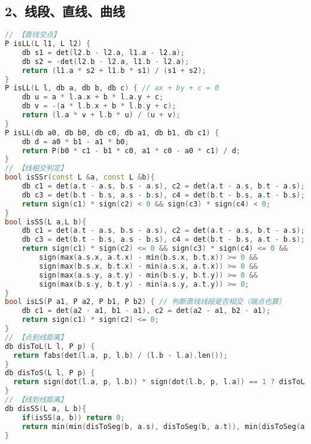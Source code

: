 \subsection{2、线段、直线、曲线}
\begin{lstlisting}[language=C++]
// 【直线交点】
P isLL(L l1, L l2) {
	db s1 = det(l2.b - l2.a, l1.a - l2.a);
	db s2 = -det(l2.b - l2.a, l1.b - l2.a);
	return (l1.a * s2 + l1.b * s1) / (s1 + s2);
}
P isLL(L l, db a, db b, db c) { // ax + by + c = 0
	db u = a * l.a.x + b * l.a.y + c;
	db v = -(a * l.b.x + b * l.b.y + c);
	return (l.a * v + l.b * u) / (u + v);
}
P isLL(db a0, db b0, db c0, db a1, db b1, db c1) {
	db d = a0 * b1 - a1 * b0;
	return P(b0 * c1 - b1 * c0, a1 * c0 - a0 * c1) / d;
}
// 【线相交判定】
bool isSSr(const L &a, const L &b){
	db c1 = det(a.t - a.s, b.s - a.s), c2 = det(a.t - a.s, b.t - a.s);
	db c3 = det(b.t - b.s, a.s - b.s), c4 = det(b.t - b.s, a.t - b.s);
	return sign(c1) * sign(c2) < 0 && sign(c3) * sign(c4) < 0;
}
bool isSS(L a,L b){
	db c1 = det(a.t - a.s, b.s - a.s), c2 = det(a.t - a.s, b.t - a.s);
	db c3 = det(b.t - b.s, a.s - b.s), c4 = det(b.t - b.s, a.t - b.s);
	return sign(c1) * sign(c2) <= 0 && sign(c3) * sign(c4) <= 0 &&
		sign(max(a.s.x, a.t.x) - min(b.s.x, b.t.x)) >= 0 &&
		sign(max(b.s.x, b.t.x) - min(a.s.x, a.t.x)) >= 0 &&
		sign(max(a.s.y, a.t.y) - min(b.s.y, b.t.y)) >= 0 &&
		sign(max(b.s.y, b.t.y) - min(a.s.y, a.t.y)) >= 0;
}
bool isLS(P a1, P a2, P b1, P b2) { // 判断直线线段是否相交（端点也算）
	db c1 = det(a2 - a1, b1 - a1), c2 = det(a2 - a1, b2 - a1);
	return sign(c1) * sign(c2) <= 0;
}
// 【点到线距离】
db disToL(L l, P p) {
  return fabs(det(l.a, p, l.b) / (l.b - l.a).len());
}
db disToS(L l, P p) {
  return sign(dot(l.a, p, l.b)) * sign(dot(l.b, p, l.a)) == 1 ? disToL(l, p) : min((p - l.a).len(), (p - l.b).len());
}
// 【线到线距离】
db disSS(L a, L b){
	if(isSS(a, b)) return 0;
	return min(min(disToSeg(b, a.s), disToSeg(b, a.t)), min(disToSeg(a, b.s), disToSeg(a, b.t)));
}
\end{lstlisting}

